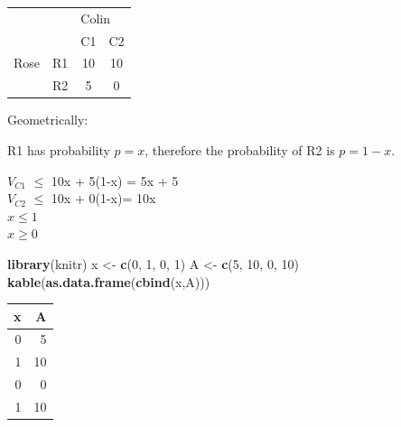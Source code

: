 \documentclass[]{article}
\newenvironment{Shaded}{\begin{snugshade}}{\end{snugshade}}
\newcommand{\KeywordTok}[1]{\textcolor[rgb]{0.13,0.29,0.53}{\textbf{{#1}}}}
\newcommand{\DecValTok}[1]{\textcolor[rgb]{0.00,0.00,0.81}{{#1}}}
\newcommand{\StringTok}[1]{\textcolor[rgb]{0.31,0.60,0.02}{{#1}}}
\newcommand{\NormalTok}[1]{{#1}}
\begin{document}
\begin{table}[!h]
\centering
\begin{tabular}{lllc}
 &  & \multicolumn{2}{l}{Colin} \\ \cline{3-4}
 &  & C1 & \multicolumn{1}{l}{C2} \\ \hline
Rose & R1 & \multicolumn{1}{c}{10} & 10 \\
 & R2 & \multicolumn{1}{c}{5} & 0 \\ \hline
\end{tabular}
\end{table}

Geometrically:

R1 has probability \(p = x\), therefore the probability of R2 is
\(p=1-x\).

\(V_{C1}\) \(\leq\) 10x + 5(1-x) = 5x + 5\\
\(V_{C2}\) \(\leq\) 10x + 0(1-x)= 10x\\
\(x \leq 1\)\\
\(x \geq 0\)

\begin{Shaded}
\begin{Highlighting}[]
\KeywordTok{library}\NormalTok{(knitr)}
\NormalTok{x <-}\StringTok{ }\KeywordTok{c}\NormalTok{(}\DecValTok{0}\NormalTok{, }\DecValTok{1}\NormalTok{, }\DecValTok{0}\NormalTok{, }\DecValTok{1}\NormalTok{)}
\NormalTok{A <-}\StringTok{ }\KeywordTok{c}\NormalTok{(}\DecValTok{5}\NormalTok{, }\DecValTok{10}\NormalTok{, }\DecValTok{0}\NormalTok{, }\DecValTok{10}\NormalTok{)}
\KeywordTok{kable}\NormalTok{(}\KeywordTok{as.data.frame}\NormalTok{(}\KeywordTok{cbind}\NormalTok{(x,A)))}
\end{Highlighting}
\end{Shaded}

\begin{longtable}[]{@{}rr@{}}
\toprule
x & A\tabularnewline
\midrule
\endhead
0 & 5\tabularnewline
1 & 10\tabularnewline
0 & 0\tabularnewline
1 & 10\tabularnewline
\bottomrule
\end{longtable}
\end{document}

